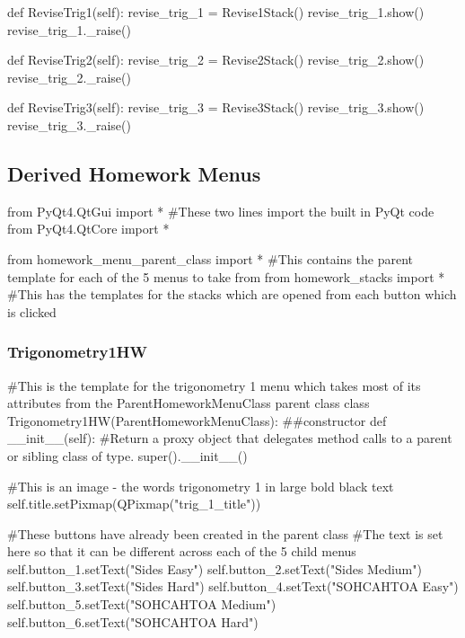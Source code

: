 \begin{landscape}
\begin{python}
    def ReviseTrig1(self):
        revise_trig_1 = Revise1Stack()
        revise_trig_1.show()
        revise_trig_1._raise()

    def ReviseTrig2(self):
        revise_trig_2 = Revise2Stack()
        revise_trig_2.show()
        revise_trig_2._raise()

    def ReviseTrig3(self):
        revise_trig_3 = Revise3Stack()
        revise_trig_3.show()
        revise_trig_3._raise()
\end{python}

\subsection{Derived Homework Menus}

\begin{python}
from PyQt4.QtGui import * #These two lines import the built in PyQt code
from PyQt4.QtCore import *

from homework_menu_parent_class import * #This contains the parent template for each of the 5 menus to take from
from homework_stacks import * #This has the templates for the stacks which are opened from each button which is clicked
\end{python}

\subsubsection{Trigonometry1HW}

\begin{python}
#This is the template for the trigonometry 1 menu which takes most of its attributes from the ParentHomeworkMenuClass parent class
class Trigonometry1HW(ParentHomeworkMenuClass):
    ##constructor
    def __init__(self):
        #Return a proxy object that delegates method calls to a parent or sibling class of type.
        super().__init__()

        #This is an image - the words trigonometry 1 in large bold black text
        self.title.setPixmap(QPixmap("trig_1_title"))

        #These buttons have already been created in the parent class
        #The text is set here so that it can be different across each of the 5 child menus
        self.button_1.setText("Sides Easy")
        self.button_2.setText("Sides Medium")
        self.button_3.setText("Sides Hard")
        self.button_4.setText("SOHCAHTOA Easy")
        self.button_5.setText("SOHCAHTOA Medium")
        self.button_6.setText("SOHCAHTOA Hard")


\end{python}
\end{landscape}
